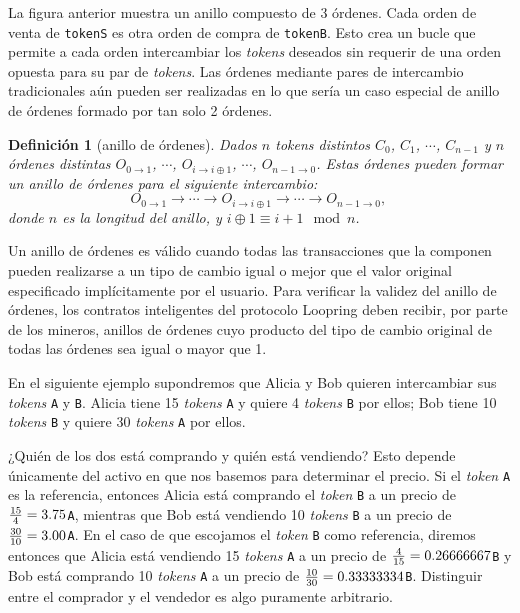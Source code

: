 \documentclass[UTF8,nofonts]{article}
\newtheorem{definition}{Definición}[section]
\begin{document}
\begin{multicols}{2}
La figura anterior muestra un anillo compuesto de 3 órdenes. Cada orden de venta de \verb|tokenS| es otra orden de compra de \verb|tokenB|. Esto crea un bucle que permite a cada orden intercambiar los \textit{tokens} deseados sin requerir de una orden opuesta para su par de \textit{tokens}. Las órdenes mediante pares de intercambio tradicionales aún pueden ser realizadas en lo que sería un caso especial de anillo de órdenes formado por tan solo 2 órdenes.

\begin{definition}[anillo de órdenes] Dados $n$ tokens distintos $C_{0}$, $C_{1}$, $\cdots$, $C_{n-1}$  y $n$ órdenes distintas $O_{0\rightarrow 1}$, $\cdots$, $O_{i\rightarrow i\oplus 1}$, $\cdots$, $O_{n-1 \rightarrow 0}$. Estas órdenes pueden formar un anillo de órdenes para el siguiente intercambio:
$$O_{0\rightarrow 1} \rightarrow \cdots \rightarrow O_{i\rightarrow i\oplus 1} \rightarrow \cdots \rightarrow O_{n-1\rightarrow 0} \text{, }$$
donde $n$ es la longitud del anillo, y $i\oplus 1 \equiv i+1 \mod n$.
\end{definition}

Un anillo de órdenes es válido cuando todas las transacciones que la componen pueden realizarse a un tipo de cambio igual o mejor que el valor original especificado implícitamente por el usuario. Para verificar la validez del anillo de órdenes, los contratos inteligentes del protocolo Loopring deben recibir, por parte de los mineros, anillos de órdenes cuyo producto del tipo de cambio original de todas las órdenes sea igual o mayor que 1.

En el siguiente ejemplo supondremos que Alicia y Bob quieren intercambiar sus \textit{tokens} \verb|A| y \verb|B|. Alicia tiene 15 \textit{tokens} \verb|A| y quiere 4 \textit{tokens} \verb|B| por ellos; Bob tiene 10 \textit{tokens} \verb|B|  y quiere 30 \textit{tokens} \verb|A| por ellos.

¿Quién de los dos está comprando y quién está vendiendo? Esto depende únicamente del activo en que nos basemos para determinar el precio. Si el \textit{token} \verb|A| es la referencia, entonces Alicia está comprando el \textit{token} \verb|B| a un precio de ${15 \over 4} = 3.75$\verb|A|, mientras que Bob está vendiendo 10 \textit{tokens} \verb|B| a un precio de ${30 \over 10} = 3.00$\verb|A|. En el caso de que escojamos el \textit{token} \verb|B| como referencia, diremos entonces que Alicia está vendiendo 15 \textit{tokens} \verb|A| a un precio de ${4\over 15}=0.26666667$\verb|B| y Bob está comprando 10 \textit{tokens} \verb|A| a un precio de ${10 \over 30}=0.33333334$\verb|B|. Distinguir entre el comprador y el vendedor es algo puramente arbitrario.


\end{multicols}
\end{document}
